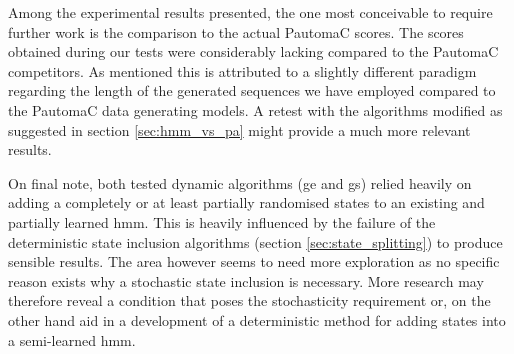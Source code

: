 Among the experimental results presented, the one most conceivable to require further work is the comparison to the actual PautomaC scores. The scores obtained during our tests were considerably lacking compared to the PautomaC competitors. As mentioned this is attributed to a slightly different paradigm regarding the length of the generated sequences we have employed compared to the PautomaC data generating models. A retest with the algorithms modified as suggested in section \ref{sec:hmm_vs_pa} might provide a much more relevant results.

On final note, both tested dynamic algorithms (\acrlong{ge} and \acrlong{gs}) relied heavily on adding a completely or at least partially randomised states to an existing and partially learned \gls{hmm}. This is heavily influenced by the failure of the deterministic state inclusion algorithms (section \ref{sec:state_splitting}) to produce sensible results. The area however seems to need more exploration as no specific reason exists why a stochastic state inclusion is necessary. More research may therefore reveal a condition that poses the stochasticity requirement or, on the other hand aid in a development of a deterministic method for adding states into a semi-learned \gls{hmm}.

